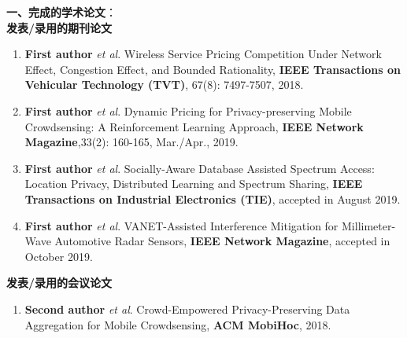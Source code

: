 \textbf{一、完成的学术论文}：\\

\textbf{{发表/录用的期刊论文}}

\begin{enumerate}
\item \textbf{First author} \emph{et al}. Wireless Service Pricing Competition Under Network Effect, Congestion Effect, and Bounded Rationality, \textbf{IEEE Transactions on Vehicular Technology (TVT)}, 67(8): 7497-7507, 2018.
\item \textbf{First author} \emph{et al}. Dynamic Pricing for Privacy-preserving Mobile Crowdsensing: A Reinforcement Learning Approach, \textbf{IEEE Network Magazine},33(2): 160-165, Mar./Apr., 2019.
\item  \textbf{First author} \emph{et al}. Socially-Aware Database Assisted Spectrum Access: Location Privacy, Distributed Learning and Spectrum Sharing, \textbf{IEEE Transactions on Industrial Electronics (TIE)}, accepted in August 2019.
\item  \textbf{First author} \emph{et al}. VANET-Assisted Interference Mitigation for Millimeter-Wave Automotive Radar Sensors, \textbf{IEEE Network Magazine}, accepted in October 2019.
\end{enumerate}

\textbf{{发表/录用的会议论文}}
\begin{enumerate}%

\item \textbf{Second author} \emph{et al}. Crowd-Empowered Privacy-Preserving Data Aggregation for Mobile Crowdsensing, \textbf{ACM MobiHoc}, 2018.
\end{enumerate}

